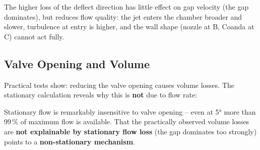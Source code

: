 \documentclass[11pt,a4paper]{article}
\begin{document}
The higher loss of the deflect direction has little effect on gap velocity (the gap dominates), but reduces flow quality: the jet enters the chamber broader and slower, turbulence at entry is higher, and the wall shape (nozzle at B, Coanda at C) cannot act fully.

\subsection{Valve Opening and Volume}

Practical tests show: reducing the valve opening causes volume losses. The stationary calculation reveals why this is \textbf{not} due to flow rate:

\begin{table}[H]
\centering\small
{}
\caption{Volume flow at various valve opening angles (at 1000\,Pa, wall A)}
\end{table}

\begin{warnbox}
Stationary flow is remarkably insensitive to valve opening -- even at 5° more than 99\,\% of maximum flow is available. That the practically observed volume losses are \textbf{not explainable by stationary flow loss} (the gap dominates too strongly) points to a \textbf{non-stationary mechanism}.
\end{warnbox}
\end{document}
